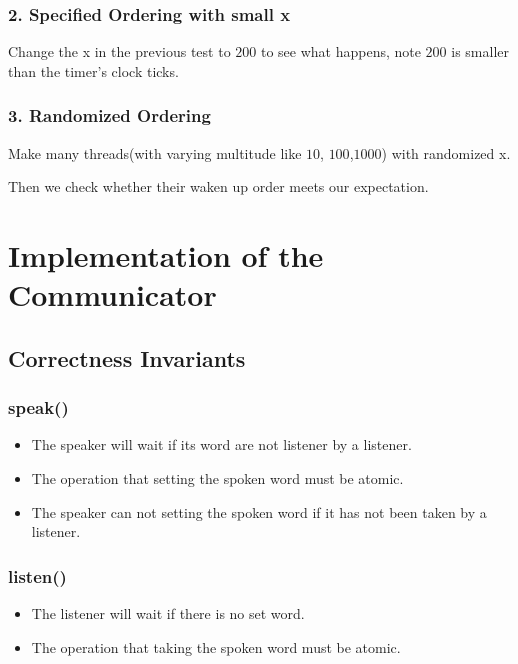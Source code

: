 \documentclass{article}
\begin{document}
	\subsubsection*{2. Specified Ordering with small x}
	Change the x in the previous test to $200$ to see what happens, note $200$ is smaller than the timer's clock ticks.
	
	\subsubsection*{3. Randomized Ordering}
	Make many threads(with varying multitude like $10$, $100$,$1000$) with randomized x.
	
	Then we check whether their waken up order meets our expectation.
%	
	\section{Implementation of the Communicator}
	
	\subsection{Correctness Invariants}
	
	\subsubsection*{speak()}
	\begin{itemize}
		\item The speaker will wait if its word are not listener by a listener.
		\item The operation that setting the spoken word must be atomic.
		\item The speaker can not setting the spoken word if it has not been taken by a listener.
	\end{itemize}
	
	\subsubsection*{listen()}
	\begin{itemize}
		\item The listener will wait if there is no set word.
		\item The operation that taking the spoken word must be atomic.
	\end{itemize}
	
\end{document}
